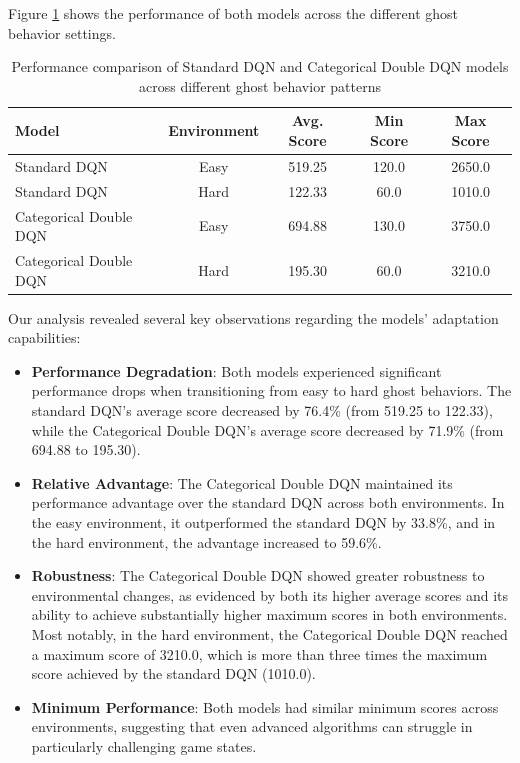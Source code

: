 \documentclass{article} %
\begin{document}
Figure \ref{tab:ghost_adaptation} shows the performance of both models across the different ghost behavior settings.

\begin{table}[h]
  \centering
  \begin{tabular}{|l|c|c|c|c|}
    \hline
    \textbf{Model}         & \textbf{Environment} & \textbf{Avg. Score} & \textbf{Min Score} & \textbf{Max Score} \\
    \hline
    Standard DQN           & Easy                 & 519.25              & 120.0              & 2650.0             \\
    Standard DQN           & Hard                 & 122.33              & 60.0               & 1010.0             \\
    \hline
    Categorical Double DQN & Easy                 & 694.88              & 130.0              & 3750.0             \\
    Categorical Double DQN & Hard                 & 195.30              & 60.0               & 3210.0             \\
    \hline
  \end{tabular}
  \caption{Performance comparison of Standard DQN and Categorical Double DQN models across different ghost behavior patterns}
  \label{tab:ghost_adaptation}
\end{table}

Our analysis revealed several key observations regarding the models' adaptation capabilities:

\begin{itemize}
  \item \textbf{Performance Degradation}: Both models experienced significant performance drops when transitioning from easy to hard ghost behaviors. The standard DQN's average score decreased by 76.4\% (from 519.25 to 122.33), while the Categorical Double DQN's average score decreased by 71.9\% (from 694.88 to 195.30).

  \item \textbf{Relative Advantage}: The Categorical Double DQN maintained its performance advantage over the standard DQN across both environments. In the easy environment, it outperformed the standard DQN by 33.8\%, and in the hard environment, the advantage increased to 59.6\%.

  \item \textbf{Robustness}: The Categorical Double DQN showed greater robustness to environmental changes, as evidenced by both its higher average scores and its ability to achieve substantially higher maximum scores in both environments. Most notably, in the hard environment, the Categorical Double DQN reached a maximum score of 3210.0, which is more than three times the maximum score achieved by the standard DQN (1010.0).

  \item \textbf{Minimum Performance}: Both models had similar minimum scores across environments, suggesting that even advanced algorithms can struggle in particularly challenging game states.
\end{itemize}
\end{document}
